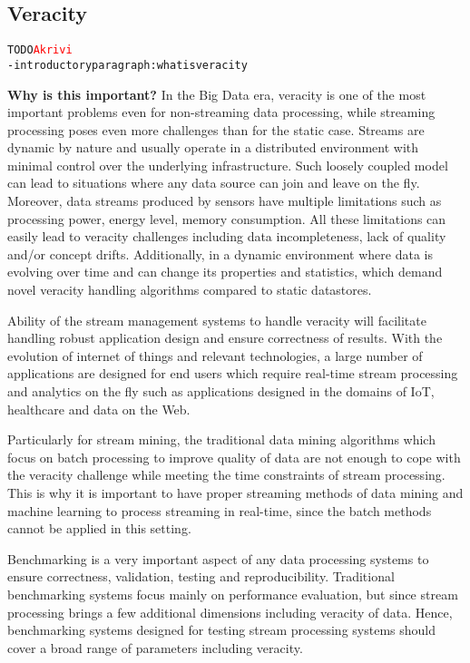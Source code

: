\subsection{Veracity}



\begin{alltt}TODO\scriptsize \textcolor{red}{Akrivi}
- introductory paragraph: what is veracity
\end{alltt}

\textbf{Why is this important?}
In the Big Data era, veracity is one of the most important problems even for non-streaming data processing, while streaming processing poses even more challenges than for the static case. Streams are dynamic by nature and usually operate in a distributed environment with minimal control over the underlying infrastructure. Such loosely coupled model can lead to situations where any data source can join and leave on the fly. Moreover, data streams produced by sensors have multiple limitations such as processing power, energy level, memory consumption. All these limitations can easily lead to veracity challenges including data incompleteness, lack of quality and/or concept drifts. Additionally, in a dynamic environment where data is evolving over time and can change its properties and statistics, which demand novel veracity handling algorithms compared to static datastores.  

Ability of the stream management systems to handle veracity will facilitate handling robust application design and ensure correctness of results. With the evolution of internet of things and relevant technologies, a large number of applications are designed for end users which require real-time stream processing and analytics on the fly such as applications designed in the domains of IoT, healthcare and data on the Web. 

Particularly for stream mining, the traditional data mining algorithms which focus on batch processing to improve quality of data are not enough to cope with the veracity challenge while meeting the time constraints of stream processing. This is why it is important to have proper streaming methods of data mining and machine learning to process streaming in real-time, since the batch methods cannot be applied in this setting.

Benchmarking is a very important aspect of any data processing systems to ensure correctness, validation, testing and reproducibility. Traditional benchmarking systems focus mainly on performance evaluation, but since stream processing brings a few additional dimensions including veracity of data. Hence, benchmarking systems designed for testing stream processing systems should cover a broad range of parameters including veracity. 

